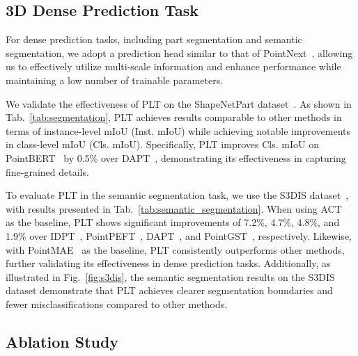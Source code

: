 









\subsection{3D Dense Prediction Task}
For dense prediction tasks, including part segmentation and semantic segmentation, we adopt a prediction head similar to that of PointNext~\cite{qian2022pointnext}, allowing us to effectively utilize multi-scale information and enhance performance while maintaining a low number of trainable parameters.

We validate the effectiveness of PLT on the ShapeNetPart dataset~\cite{yi2016scalable}. As shown in Tab.~\ref{tab:segmentation}, PLT achieves results comparable to other methods in terms of instance-level mIoU (Inst. mIoU) while achieving notable improvements in class-level mIoU (Cls. mIoU). Specifically, PLT improves Cls. mIoU on PointBERT~\cite{yu2022point} by 0.5\% over DAPT~\cite{zhou2024dynamic}, demonstrating its effectiveness in capturing fine-grained details.

To evaluate PLT in the semantic segmentation task, we use the S3DIS dataset~\cite{armeni20163d}, with results presented in Tab.~\ref{tab:semantic_segmentation}. When using ACT~\cite{dong2022autoencoders} as the baseline, PLT shows significant improvements of 7.2\%, 4.7\%, 4.8\%, and 1.9\% over IDPT~\cite{zha2023instance}, PointPEFT~\cite{tang2024point}, DAPT~\cite{zhou2024dynamic}, and PointGST~\cite{liang2024parameter}, respectively. Likewise, with PointMAE~\cite{pang2022masked} as the baseline, PLT consistently outperforms other methods, further validating its effectiveness in dense prediction tasks. Additionally, as illustrated in Fig.~\ref{fig:s3dis}, the semantic segmentation results on the S3DIS dataset demonstrate that PLT achieves clearer segmentation boundaries and fewer misclassifications compared to other methods.












\subsection{Ablation Study}

